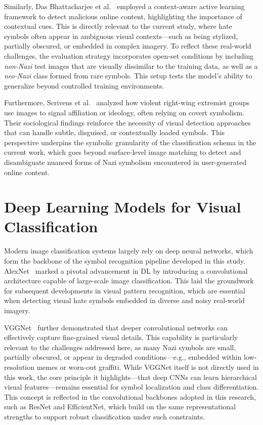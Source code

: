 Similarly, Das Bhattacharjee et al.~\parencite{dasbhattacharjee2019365} employed a context-aware active learning
framework to detect malicious online content, highlighting the importance of contextual cues. This is directly
relevant to the current study, where hate symbols often appear in ambiguous visual contexts—such as being stylized,
partially obscured, or embedded in complex imagery. To reflect these real-world challenges, the evaluation strategy
incorporates open-set conditions by including \textit{non-Nazi} test images that are visually dissimilar to the
training data, as well as a \textit{neo-Nazi} class formed from rare symbols. This setup tests the model's ability
to generalize beyond controlled training environments.

Furthermore, Scrivens et al.~\parencite{scrivens2021dangerous} analyzed how violent right-wing extremist groups use
images to signal affiliation or ideology, often relying on covert symbolism. Their sociological findings reinforce
the necessity of visual detection approaches that can handle subtle, disguised, or contextually loaded symbols. This
perspective underpins the symbolic granularity of the classification schema in the current work, which goes
beyond surface-level image matching to detect and disambiguate nuanced forms of Nazi symbolism encountered in
user-generated online content.

\section{Deep Learning Models for Visual Classification}

Modern image classification systems largely rely on deep neural networks, which form the backbone of the symbol
recognition pipeline developed in this study. AlexNet~\parencite{krizhevsky2012imagenet} marked a pivotal
advancement in \ac{DL} by introducing a convolutional architecture capable of large-scale image classification. This
laid the groundwork for subsequent developments in visual pattern recognition, which are essential when detecting
visual hate symbols embedded in diverse and noisy real-world imagery.

VGGNet~\parencite{simonyan2014very} further demonstrated that deeper convolutional networks can effectively capture
fine-grained visual details. This capability is particularly relevant to the challenges addressed here, as many Nazi
symbols are small, partially obscured, or appear in degraded conditions—e.g., embedded within low-resolution memes
or worn-out graffiti. While VGGNet itself is not directly used in this work, the core principle it highlights—that
deep \ac{CNN}s can learn hierarchical visual features—remains essential for symbol localization and class
differentiation. This concept is reflected in the convolutional backbones adopted in this research, such as ResNet
and EfficientNet, which build on the same representational strengths to support robust classification under such
constraints.

